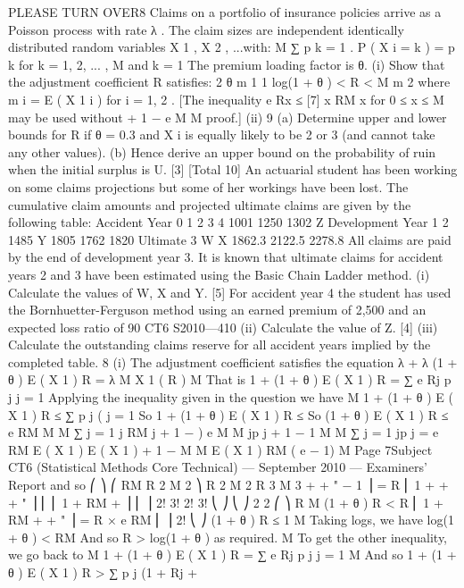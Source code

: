PLEASE TURN OVER8
Claims on a portfolio of insurance policies arrive as a Poisson process with rate λ .
The claim sizes are independent identically distributed random variables
X 1 , X 2 , ...with:
M
∑ p k = 1 .
P ( X i = k ) = p k for k = 1, 2, ... , M and
k = 1
The premium loading factor is θ.
(i)
Show that the adjustment coefficient R satisfies:
2 θ m 1
1
log(1 + θ ) < R <
M
m 2
where m i = E ( X 1 i ) for i = 1, 2 .
[The inequality e Rx ≤
[7]
x RM
x
for 0 ≤ x ≤ M may be used without
+ 1 −
e
M
M
proof.]
(ii)
9
(a) Determine upper and lower bounds for R if θ = 0.3 and X i is equally
likely to be 2 or 3 (and cannot take any other values).
(b) Hence derive an upper bound on the probability of ruin when the initial
surplus is U.
[3]
[Total 10]
An actuarial student has been working on some claims projections but some of her
workings have been lost. The cumulative claim amounts and projected ultimate
claims are given by the following table:
Accident
Year 0
1
2
3
4 1001
1250
1302
Z
Development Year
1
2
1485
Y
1805
1762
1820
Ultimate
3
W
X
1862.3
2122.5
2278.8
All claims are paid by the end of development year 3.
It is known that ultimate claims for accident years 2 and 3 have been estimated using
the Basic Chain Ladder method.
(i)
Calculate the values of W, X and Y.
[5]
For accident year 4 the student has used the Bornhuetter-Ferguson method using an
earned premium of 2,500 and an expected loss ratio of 90%
CT6 S2010—410
(ii) Calculate the value of Z.
[4]
(iii) Calculate the outstanding claims reserve for all accident years implied by the
completed table.
8
(i)
The adjustment coefficient satisfies the equation
λ + λ (1 + θ ) E ( X 1 ) R = λ M X 1 ( R )
M
That is 1 + (1 + θ ) E ( X 1 ) R = ∑ e Rj p j
j = 1
Applying the inequality given in the question we have
M
1 + (1 + θ ) E ( X 1 ) R ≤ ∑ p j (
j = 1
So 1 + (1 + θ ) E ( X 1 ) R ≤
So (1 + θ ) E ( X 1 ) R ≤
e RM
M
M
∑
j = 1
j RM
j
+ 1 − )
e
M
M
jp j + 1 −
1
M
M
∑
j = 1
jp j =
e RM E ( X 1 )
E ( X 1 )
+ 1 −
M
M
E ( X 1 ) RM
( e
− 1)
M
Page 7Subject CT6 (Statistical Methods Core Technical) — September 2010 — Examiners’ Report
and so
⎛
⎞
⎛ RM R 2 M 2
⎞
R 2 M 2 R 3 M 3
+
+ " − 1 ⎟ = R ⎜ 1 +
+
+ " ⎟
⎜ ⎜ 1 + RM +
⎟
⎜
⎟
2!
3!
2!
3!
⎝
⎠
⎝
⎠
2
2
⎛
⎞
R M
(1 + θ ) R < R ⎜ 1 + RM +
+ " ⎟ = R × e RM
⎜
⎟
2!
⎝
⎠
(1 + θ ) R ≤
1
M
Taking logs, we have
log(1 + θ ) < RM
And so R >
log(1 + θ )
as required.
M
To get the other inequality, we go back to
M
1 + (1 + θ ) E ( X 1 ) R = ∑ e Rj p j
j = 1
M
And so 1 + (1 + θ ) E ( X 1 ) R > ∑ p j (1 + Rj +
